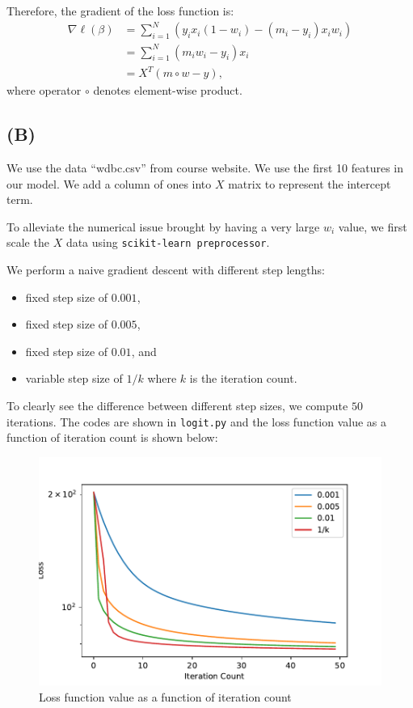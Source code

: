 \documentclass[a4paper,11pt]{article}
\begin{document}
Therefore, the gradient of the loss function is:
\begin{align}
		\nabla \ell (\beta) &=\sum_{i=1}^N \left ( y_i x_i (1-w_i) - (m_i - y_i) x_i w_i \right ) \\
		&= \sum_{i=1}^N (m_iw_i-y_i)x_i \\
		&= X^T(m\circ w-y),
	\end{align}
where operator $\circ$ denotes element-wise product.

\subsection{(B)}

We use the data “wdbc.csv” from course website. We use the first 10 features in our model. We add a column of ones into $X$ matrix to represent the intercept term.

To alleviate the numerical issue brought by having a very large $w_i$ value, we first scale the $X$ data using \texttt{scikit-learn preprocessor}. 

We perform a naive gradient descent with different step lengths:
 \begin{itemize}
 	\item fixed step size of $0.001$,
 	\item fixed step size of $0.005$,
 	\item fixed step size of $0.01$, and
 	\item variable step size of $1/k$ where $k$ is the iteration count.
 \end{itemize}

 To clearly see the difference between different step sizes, we compute $50$ iterations. The codes are shown in \texttt{logit.py} and the loss function value as a function of iteration count is shown below:

\begin{figure}[!h]
\caption{Loss function value as a function of iteration count}
\centering
\includegraphics[width = \textwidth]{fig_logit}
\end{figure}
\end{document}
